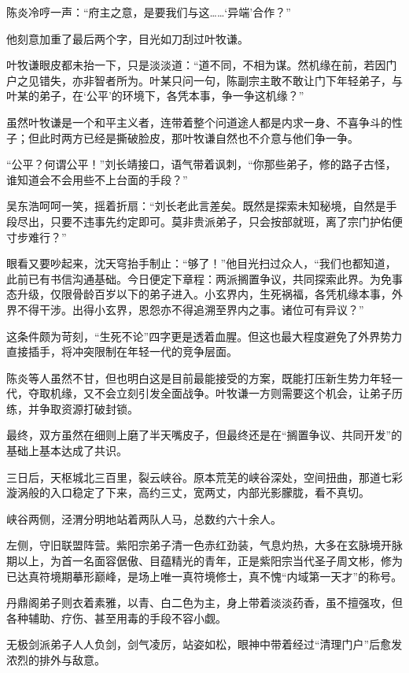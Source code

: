 陈炎冷哼一声：“府主之意，是要我们与这……‘异端’合作？”

他刻意加重了最后两个字，目光如刀刮过叶牧谦。

叶牧谦眼皮都未抬一下，只是淡淡道：“道不同，不相为谋。然机缘在前，若因门户之见错失，亦非智者所为。叶某只问一句，陈副宗主敢不敢让门下年轻弟子，与叶某的弟子，在‘公平’的环境下，各凭本事，争一争这机缘？”

虽然叶牧谦是一个和平主义者，连带着整个问道途人都是内求一身、不喜争斗的性子；但此时两方已经是撕破脸皮，那叶牧谦自然也不介意与他们争一争。

“公平？何谓公平！”刘长靖接口，语气带着讽刺，“你那些弟子，修的路子古怪，谁知道会不会用些不上台面的手段？”

吴东浩呵呵一笑，摇着折扇：“刘长老此言差矣。既然是探索未知秘境，自然是手段尽出，只要不违事先约定即可。莫非贵派弟子，只会按部就班，离了宗门护佑便寸步难行？”

眼看又要吵起来，沈天穹抬手制止：“够了！”他目光扫过众人，“我们也都知道，此前已有书信沟通基础。今日便定下章程：两派搁置争议，共同探索此界。为免事态升级，仅限骨龄百岁以下的弟子进入。小玄界内，生死祸福，各凭机缘本事，外界不得干涉。出得小玄界，恩怨亦不得追溯至界内之事。诸位可有异议？”

这条件颇为苛刻，“生死不论”四字更是透着血腥。但这也最大程度避免了外界势力直接插手，将冲突限制在年轻一代的竞争层面。

陈炎等人虽然不甘，但也明白这是目前最能接受的方案，既能打压新生势力年轻一代，夺取机缘，又不会立刻引发全面战争。叶牧谦一方则需要这个机会，让弟子历练，并争取资源打破封锁。

最终，双方虽然在细则上磨了半天嘴皮子，但最终还是在“搁置争议、共同开发”的基础上基本达成了共识。

\vspace{2em}

三日后，天枢城北三百里，裂云峡谷。原本荒芜的峡谷深处，空间扭曲，那道七彩漩涡般的入口稳定了下来，高约三丈，宽两丈，内部光影朦胧，看不真切。

峡谷两侧，泾渭分明地站着两队人马，总数约六十余人。

左侧，守旧联盟阵营。紫阳宗弟子清一色赤红劲装，气息灼热，大多在玄脉境开脉期以上，为首一名面容倨傲、目蕴精光的青年，正是紫阳宗当代圣子周文彬，修为已达真符境期摹形巅峰，是场上唯一真符境修士，真不愧“内域第一天才”的称号。

丹鼎阁弟子则衣着素雅，以青、白二色为主，身上带着淡淡药香，虽不擅强攻，但各种辅助、疗伤、甚至用毒的手段不容小觑。

无极剑派弟子人人负剑，剑气凌厉，站姿如松，眼神中带着经过“清理门户”后愈发浓烈的排外与敌意。

